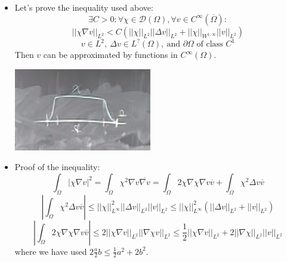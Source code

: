 \documentclass{article}
\begin{document}
\begin{itemize}
    \item Let's prove the inequality used above:
    \begin{equation}
        \exists C> 0: \forall \chi \in \mathcal{D}(\Omega), \forall v \in C^\infty(\overline{\Omega}):
    \end{equation}
    \begin{equation}
        || \chi \nabla v ||_{L^2} < C(||\chi||_{L^2} ||\Delta v||_{L^2} + ||\chi||_{W^{1, \infty}}||v||_{L^2})
    \end{equation}
    \begin{equation}
        v \in L^2, \ \Delta v \in L^? (\Omega), \ \text{and } \partial\Omega \text{ of class } C^1 
    \end{equation}
    Then $v$ can be approximated by functions in $C^\infty(\Omega)$.

    \begin{center}
        \includegraphics[width=6cm]{screenshots/2.png}    
    \end{center}
    

    \item Proof of the inequality:
    \begin{equation}
        \int_\Omega |\chi \nabla v|^2 = \int_\Omega  \chi^2 \nabla v \overline{\nabla v} = \int_\Omega 2\chi\nabla \chi\nabla v \overline{v} + \int_\Omega \chi^2 \Delta v \overline{v} 
    \end{equation}
    \begin{equation}
        |\int_\Omega \chi^2 \Delta v \overline{v} | \leq ||\chi||_{L^\infty}^2 ||\Delta v||_{L^2}||v||_{L^2} \leq ||\chi||_{L^\infty}^2 (||\Delta v||_{L^2} + ||v||_{L^2})
    \end{equation}
    \begin{equation}
        |\int_\Omega 2 \chi \nabla \chi \nabla v \overline{v}| \leq 2 ||\chi \nabla v ||_{L^2} ||\nabla \chi v||_{L^2} \leq \frac{1}{2} ||\chi \nabla v||_{L^2} + 2 ||\nabla \chi||_{L^2} ||v||_{L^2}
    \end{equation}
    where we have used $2 \frac{a}{2} b \leq \frac{1}{2}a^2 + 2b^2$.


\end{itemize}
\end{document}
